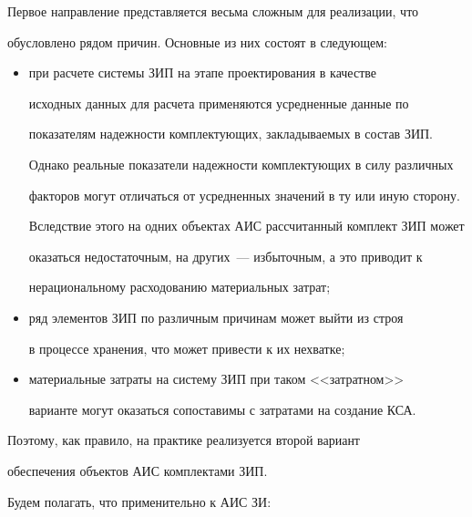      


     Первое направление представляется весьма сложным для реализации, что 


обусловлено рядом причин. Основные из них состоят в следующем:


     \begin{itemize}


     \item при расчете системы ЗИП на этапе проектирования в качестве 


исходных данных для расчета применяются усредненные данные по 


показателям надежности комплектующих, закладываемых в состав ЗИП. 


Однако реальные показатели надежности комплектующих в силу различных 


факторов могут отличаться от усредненных значений в ту или иную сторону. 


Вследствие этого на одних объектах АИС рассчитанный комплект ЗИП может 


оказаться недостаточным, на других~--- избыточным, а это приводит к 


нерациональному расходованию материальных затрат;


     \item ряд элементов ЗИП по различным причинам может выйти из строя 


в процессе хранения, что может привести к их нехватке;


     \item материальные затраты на систему ЗИП при таком <<затратном>> 


варианте могут оказаться сопоставимы с затратами на создание КСА.


     \end{itemize}


     


     Поэтому, как правило, на практике реализуется второй вариант 


обеспечения объектов АИС комплектами ЗИП.


     


     Будем полагать, что применительно к АИС ЗИ:


